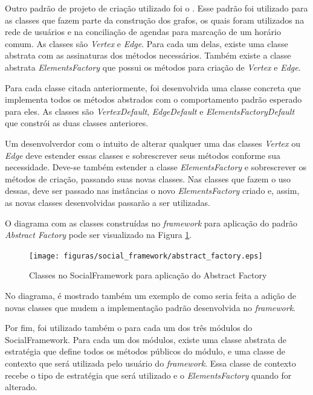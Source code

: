 Outro padrão de projeto de criação utilizado foi o . Esse padrão foi utilizado para as classes que fazem parte da construção dos grafos, os quais foram utilizados na rede de usuários e na conciliação de agendas para marcação de um horário comum. As classes são \textit{Vertex} e \textit{Edge}. Para cada um delas, existe uma classe abstrata com as assinaturas dos métodos necessários. Também existe a classe abstrata \textit{ElementsFactory} que possui os métodos para criação de \textit{Vertex} e \textit{Edge}.

Para cada classe citada anteriormente, foi desenvolvida uma classe concreta que implementa todos os métodos abstrados com o comportamento padrão esperado para eles. As classes são \textit{VertexDefault}, \textit{EdgeDefault} e \textit{ElementsFactoryDefault} que constrói as duas classes anteriores.

Um desenvolverdor com o intuito de alterar qualquer uma das classes \textit{Vertex} ou \textit{Edge} deve estender essas classes e sobrescrever seus métodos conforme sua necessidade. Deve-se também estender a classe \textit{ElementsFactory} e sobrescrever os métodos de criação, passando suas novas classes. Nas classes que fazem o uso dessas, deve ser passado nas instâncias o novo \textit{ElementsFactory} criado e, assim, as novas classes desenvolvidas passarão a ser utilizadas.

O diagrama com as classes construídas no \textit{framework} para aplicação do padrão \textit{Abstract Factory} pode ser visualizado na Figura \ref{padrao_abstract_factory}.

\newpage
\begin{figure}[h]
    \centering
    \texttt{[image: figuras/social\_framework/abstract\_factory.eps]}
    \caption{Classes no SocialFramework para aplicação do Abstract Factory}
    \label{padrao_abstract_factory}
\end{figure}

No diagrama, é mostrado também um exemplo de como seria feita a adição de novas classes que mudem a implementação padrão desenvolvida no \textit{framework}.

Por fim, foi utilizado também o  para cada um dos três módulos do SocialFramework. Para cada um dos módulos, existe uma classe abstrata de estratégia que define todos os métodos públicos do módulo, e uma classe de contexto que será utilizada pelo usuário do \textit{framework}. Essa classe de contexto recebe o tipo de estratégia que será utilizado e o \textit{ElementsFactory} quando for alterado.

